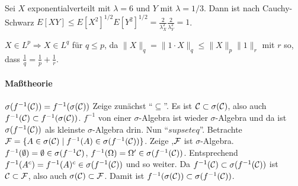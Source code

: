 \documentclass{article}
\begin{document}
Sei $X$ exponentialverteilt mit $\lambda=6$ und $Y$ mit $\lambda=1/3$. Dann ist nach Cauchy-Schwarz $E[XY]\leq E[X^2]^{1/2}E[Y^2]^{1/2}=\frac{2}{\lambda_X^2}\frac{2}{\lambda_Y^2}=1$.

$X\in L^p\Rightarrow X\in L^q$ für $q\leq p$, da $\|X\|_q=\|1\cdot X\|_q\leq\|X\|_p\|1\|_r$ mit $r$ so, dass $\frac{1}{q}=\frac{1}{p}+\frac{1}{r}$.

\paragraph{Maßtheorie}
$\sigma(f^{-1}({\cal C}))=f^{-1}(\sigma({\cal C}))$
Zeige zunächst ``$\subseteq$''.
Es ist ${\cal C}\subset\sigma({\cal C})$, also auch $f^{-1}({\cal C})\subset f^{-1}(\sigma({\cal C}))$.
$f^{-1}$ von einer $\sigma$-Algebra ist wieder $\sigma$-Algebra und da ist $\sigma(f^{-1}({\cal C}))$ als kleinste $\sigma$-Algebra drin.
Nun ``$supseteq$''.
Betrachte ${\cal F}=\{A\in\sigma({\cal C})\mid f^{-1}(A)\in\sigma(f^{-1}({\cal C}))\}$.
Zeige ,${\cal F}$ ist $\sigma$-Algebra.
$f^{-1}(\emptyset)=\emptyset\in\sigma(f^{-1}{\cal C})$, $f^{-1}(\Omega)=\Omega'\in\sigma(f^{-1}({\cal C}))$.
Entsprechend $f^{-1}(A^c)=f^{-1}(A)^c\in\sigma(f^{-1}({\cal C}))$ und so weiter.
Da $f^{-1}({\cal C})\subset\sigma(f^{-1}({\cal C}))$ ist ${\cal C}\subset{\cal F}$, also auch $\sigma({\cal C})\subset{\cal F}$.
Damit ist $f^{-1}(\sigma({\cal C}))\subset\sigma(f^{-1}({\cal C}))$.

\end{document}
